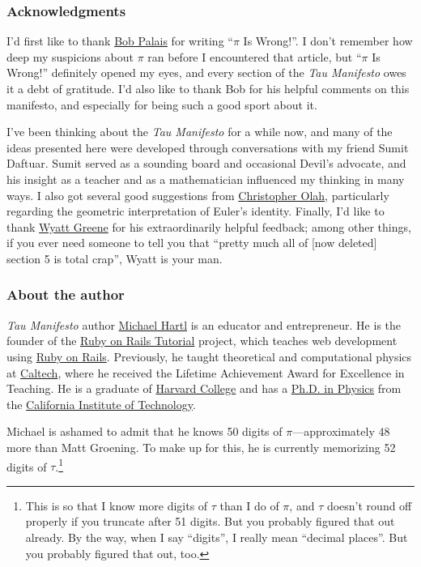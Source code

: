 \documentclass{article}
\begin{document}
  \subsubsection{Acknowledgments} %
  \label{sec:acknowledgments}

I'd first like to thank \href{http://www.math.utah.edu/~palais/}{Bob Palais} for writing ``$\pi$ Is Wrong!''. I don't remember how deep my suspicions about $\pi$ ran before I encountered that article, but ``$\pi$ Is Wrong!'' definitely opened my eyes, and every section of the \emph{Tau Manifesto} owes it a debt of gratitude. I'd also like to thank Bob for his helpful comments on this manifesto, and especially for being such a good sport about it.

I've been thinking about the \emph{Tau Manifesto} for a while now, and many of the ideas presented here were developed through conversations with my friend Sumit Daftuar. Sumit served as a sounding board and occasional Devil's advocate, and his insight as a teacher and as a mathematician influenced my thinking in many ways. I also got several good suggestions from \href{http://christopherolah.wordpress.com/about-me}{Christopher Olah}, particularly regarding the geometric interpretation of Euler's identity.  Finally, I'd like to thank \href{http://techiferous.com/about}{Wyatt Greene} for his extraordinarily helpful feedback; among other things, if you ever need someone to tell you that ``pretty much all of [now deleted] section 5 is total crap'', Wyatt is your man.



    \subsubsection{About the author} %
    \label{sec:about_the_author}
    

\emph{Tau Manifesto} author \href{http://www.michaelhartl.com/}{Michael Hartl} is an educator and entrepreneur. He is the founder of the \href{http://www.railstutorial.org/}{Ruby on Rails Tutorial} project, which teaches web development using \href{http://www.rubyonrails.org/}{Ruby on Rails}. Previously, he taught theoretical and computational physics at  \href{http://www.caltech.edu/}{Caltech}, where he received the Lifetime Achievement Award for Excellence in Teaching. He is a graduate of \href{http://college.harvard.edu/}{Harvard College} and has a \href{http://thesis.library.caltech.edu/1940/}{Ph.D. in Physics} from the \href{http://www.caltech.edu/}{California Institute of Technology}.

Michael is ashamed to admit that he knows 50 digits of $\pi$---approximately 48 more than Matt Groening. To make up for this, he is currently memorizing 52 digits of $\tau$.\footnote{This is so that I know more digits of $\tau$ than I do of $\pi$, and $\tau$ doesn't round off properly if you truncate after 51 digits. But you probably figured that out already. By the way, when I say ``digits'', I really mean ``decimal places''. But you probably figured that out, too.}
\end{document}
